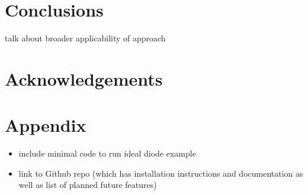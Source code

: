\documentclass[aps,prl,amsmath,amssymb,superscriptaddress,notitlepage,groupedaddress]{revtex4-1}
\begin{document}
\section*{Conclusions}
 talk about broader applicability of approach

\section*{Acknowledgements}

\section*{Appendix}
 \begin{itemize}
   \item include minimal code to run ideal diode example
   \item link to Github repo (which has installation instructions and documentation as well as list of planned future features)
  \end{itemize}



\end{document}
